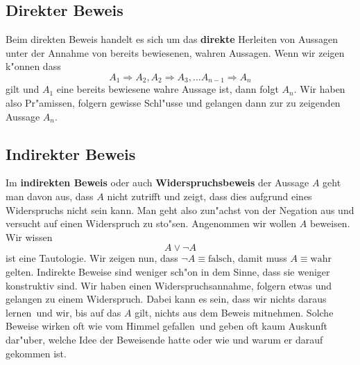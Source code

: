 \subsection{Direkter Beweis}
Beim direkten Beweis handelt es sich um das \textbf{direkte} Herleiten von Aussagen unter der Annahme von bereits bewiesenen, wahren Aussagen. Wenn wir zeigen k"onnen dass 
\begin{equation*}
A_1 \Rightarrow A_2, A_2 \Rightarrow A_3, \ldots A_{n-1} \Rightarrow A_n
\end{equation*}
gilt und $A_1$ eine bereits bewiesene wahre Aussage ist, dann folgt $A_n$. Wir haben also Pr"amissen, folgern gewisse Schl"usse und gelangen dann zur zu zeigenden Aussage $A_n$.

\subsection{Indirekter Beweis}
Im \textbf{indirekten Beweis} oder auch \textbf{Widerspruchsbeweis} der Aussage $A$ geht man davon aus, dass $A$ nicht zutrifft und zeigt, dass dies aufgrund eines Widerspruchs nicht sein kann. Man geht also zun"achst von der Negation aus und versucht auf einen Widerspruch zu sto"sen. Angenommen wir wollen $A$ beweisen. Wir wissen
\begin{equation*}
A \lor \neg A
\end{equation*}
ist eine Tautologie. Wir zeigen nun, dass $\neg A \equiv \text{falsch}$, damit muss $A \equiv \text{wahr}$ gelten. Indirekte Beweise sind weniger sch"on in dem Sinne, dass sie weniger konstruktiv sind. Wir haben einen Widerspruchsannahme, folgern etwas und gelangen zu einem Widerspruch. Dabei kann es sein, dass wir nichts daraus \glqq lernen\grqq \ und wir, bis auf das $A$ gilt, nichts aus dem Beweis \glqq mitnehmen\grqq . Solche Beweise wirken oft \glqq wie vom Himmel gefallen\grqq \ und geben oft kaum Auskunft dar"uber, welche Idee der Beweisende hatte oder wie und warum er darauf gekommen ist.

